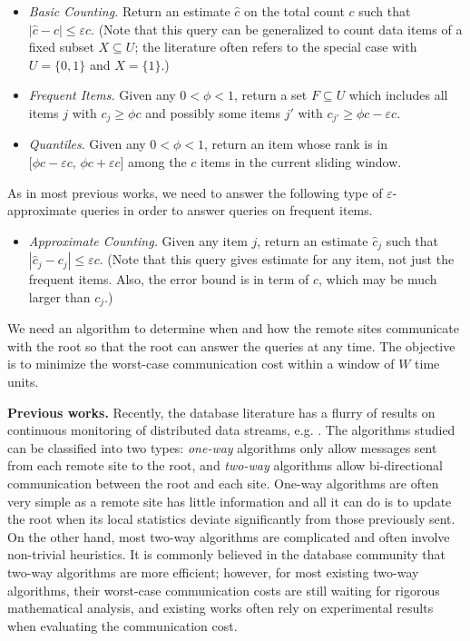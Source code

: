 \documentclass[proceedings]{stacs}
\theoremstyle{definition}\newtheorem{fact}{Fact}
\begin{document}
\begin{itemize}
\item{\it Basic Counting.}
Return an estimate $\hat c$ on the total count $c$
such that $|\hat{c} - c| \le \varepsilon
c$.  (Note that this query can be generalized to count
data items of a fixed subset $X \subseteq U$;
the literature often refers to the special case with
$U=\{0,1\}$ and $X=\{1\}$.)
\item{\it Frequent Items.}
Given any $0 < \phi < 1$,
return
a set $F\subseteq U$ which includes all items $j$ with $c_j \ge \phi c$
and possibly some items $j'$ with $c_{j'} \ge \phi c - \varepsilon c$.


\item{\it Quantiles}.
Given any $0 < \phi < 1$, return an
item whose rank is in $\bigl[ \phi c - \varepsilon c,\, \phi c +
  \varepsilon c \bigr]$
among the $c$ items in the current sliding window.
\end{itemize}
  {As in most previous works,
we need to answer the
  following type of $\varepsilon$-approximate
queries in order to answer queries on frequent items.}
\begin{itemize}
\item{\it Approximate Counting.}
Given any item $j$,
return an estimate $\hat c_j$ such that $|\hat c_j - c_j| \le \varepsilon c$.
(Note that this query gives estimate for any item, not just the
frequent items.   {Also, the error bound is in term
of $c$, which may be much larger than $c_j$.})
\end{itemize}


We need an algorithm to determine when and how
the remote sites communicate with the root so that the
root can answer the queries at any time.
The objective is to minimize the worst-case communication cost
within a window of $W$ time units.



\vspace{.5ex}
{\bf Previous works.}
Recently, the database literature has a flurry of results on continuous
monitoring of distributed data streams, e.g.
\cite{OlstonJW03,GreenwaldK04,DasGGR04,SharfmanSK06,
ManjhiSDO05,CormodeGMR05,BabcockO03,JainYDZ05,MouratidisBP06,CormodeG05}.
The algorithms studied can be classified into two
types: {\em one-way} algorithms only allow messages
sent from each remote site to the root, and
{\em two-way} algorithms allow bi-directional
communication between the root and each site.
One-way algorithms are often very simple
as a remote site has little
information and all it can do is to update the root
when its local statistics deviate significantly from those previously sent.
On the other hand,
most two-way algorithms are complicated and
often involve non-trivial heuristics.
It is commonly believed in the database community
that two-way algorithms
are more efficient; however, for most
existing two-way algorithms, their worst-case communication costs
are still waiting for rigorous mathematical analysis, and
existing works often rely on experimental results when evaluating
the communication cost.
\end{document}
